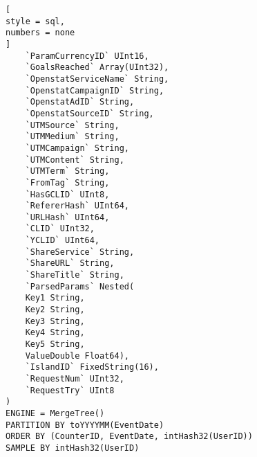 \documentclass[%
	11pt,
	a4paper,
	utf8,
		]{article}
\begin{document}
\begin{lstlisting}[
style = sql,
numbers = none
]
	`ParamCurrencyID` UInt16,
	`GoalsReached` Array(UInt32),
	`OpenstatServiceName` String,
	`OpenstatCampaignID` String,
	`OpenstatAdID` String,
	`OpenstatSourceID` String,
	`UTMSource` String,
	`UTMMedium` String,
	`UTMCampaign` String,
	`UTMContent` String,
	`UTMTerm` String,
	`FromTag` String,
	`HasGCLID` UInt8,
	`RefererHash` UInt64,
	`URLHash` UInt64,
	`CLID` UInt32,
	`YCLID` UInt64,
	`ShareService` String,
	`ShareURL` String,
	`ShareTitle` String,
	`ParsedParams` Nested(
	Key1 String,
	Key2 String,
	Key3 String,
	Key4 String,
	Key5 String,
	ValueDouble Float64),
	`IslandID` FixedString(16),
	`RequestNum` UInt32,
	`RequestTry` UInt8
)
ENGINE = MergeTree()
PARTITION BY toYYYYMM(EventDate)
ORDER BY (CounterID, EventDate, intHash32(UserID))
SAMPLE BY intHash32(UserID)
\end{lstlisting}
\end{document}
